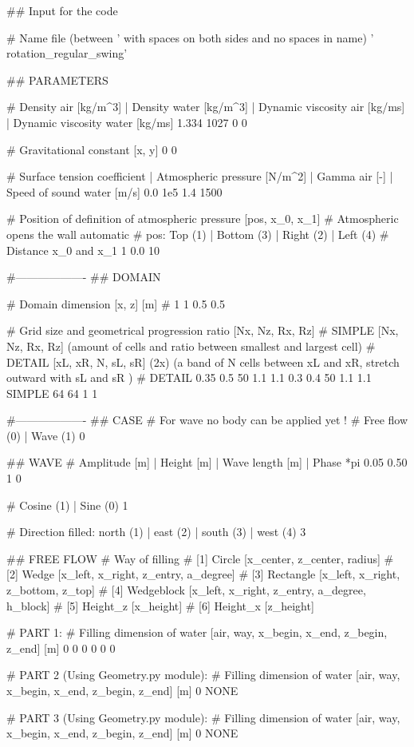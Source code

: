 ## Input for the code

# Name file (between ' with spaces on both sides and no spaces in name)
' rotation_regular_swing'

## PARAMETERS

# Density air [kg/m^3] | Density water [kg/m^3] | Dynamic viscosity air [kg/ms] | Dynamic viscosity water [kg/ms]
1.334 1027 0 0

# Gravitational constant [x, y]
0 0

# Surface tension coefficient | Atmospheric pressure [N/m^2] | Gamma air [-]	| Speed of sound water [m/s]
0.0 	1e5 	1.4		1500

# Position of definition of atmospheric pressure [pos, x_0, x_1]
# Atmospheric opens the wall automatic
# pos: Top (1)	| Bottom (3)	| Right (2)		| Left (4)
# Distance x_0 and x_1
1 0.0 10

#-------------------
## DOMAIN

# Domain dimension [x, z] [m]
# 1 1
0.5 0.5

# Grid size and geometrical progression ratio [Nx, Nz, Rx, Rz]
# SIMPLE [Nx, Nz, Rx, Rz] (amount of cells and ratio between smallest and largest cell)
# DETAIL [xL, xR, N, sL, sR] (2x) (a band of N cells between xL and xR, stretch outward with sL and sR )
# DETAIL 0.35 0.5 50 1.1 1.1 0.3 0.4 50 1.1 1.1
SIMPLE 64 64 1 1

#-------------------
## CASE
# For wave no body can be applied yet !
# Free flow (0)	| Wave (1)
0

## WAVE
# Amplitude [m] | Height [m]	| Wave length [m]	| Phase *pi
0.05 	0.50		1		0

# Cosine (1)	| Sine (0)
1

# Direction filled: north (1)	| east (2)	|	south (3)	| west (4)
3

## FREE FLOW
# Way of filling
# [1] Circle        [x_center, z_center, radius]
# [2] Wedge         [x_left, x_right, z_entry, a_degree]
# [3] Rectangle     [x_left, x_right, z_bottom, z_top]
# [4] Wedgeblock    [x_left, x_right, z_entry, a_degree, h_block]
# [5] Height_z      [x_height]
# [6] Height_x      [z_height]

# PART 1:
# Filling dimension of water [air, way, x_begin, x_end, z_begin, z_end] [m]
0 0 0 0 0 0

# PART 2 (Using Geometry.py module):
# Filling dimension of water [air, way, x_begin, x_end, z_begin, z_end] [m]
0 NONE

# PART 3 (Using Geometry.py module):
# Filling dimension of water [air, way, x_begin, x_end, z_begin, z_end] [m]
0 NONE

